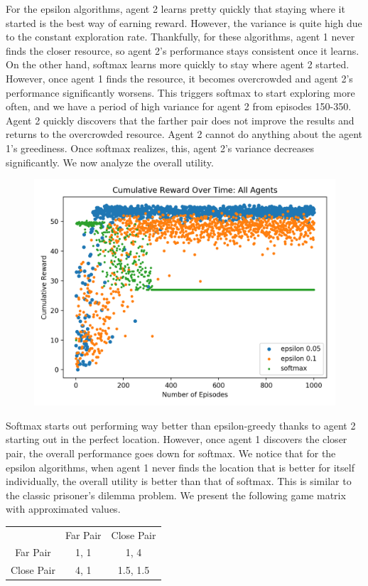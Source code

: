 \documentclass[11pt]{article}
\begin{document}
For the epsilon algorithms, agent 2 learns pretty quickly that staying where it started is the best way of earning reward. However, the variance is quite high due to the constant exploration rate. Thankfully, for these algorithms, agent 1 never finds the closer resource, so agent 2's performance stays consistent once it learns. On the other hand, softmax learns more quickly to stay where agent 2 started. However, once agent 1 finds the resource, it becomes overcrowded and agent 2's performance significantly worsens. This triggers softmax to start exploring more often, and we have a period of high variance for agent 2 from episodes 150-350. Agent 2 quickly discovers that the farther pair does not improve the results and returns to the overcrowded resource. Agent 2 cannot do anything about the agent 1's greediness. Once softmax realizes, this, agent 2's variance decreases significantly. We now analyze the overall utility.


\begin{figure}[H]
  \centering
  \includegraphics[width=.7\textwidth]{ai-env2}
\end{figure}


Softmax starts out performing way better than epsilon-greedy thanks to agent 2 starting out in the perfect location. However, once agent 1 discovers the closer pair, the overall performance goes down for softmax. We notice that for the epsilon algorithms, when agent 1 never finds the location that is better for itself individually, the overall utility is better than that of softmax. This is similar to the classic prisoner's dilemma problem. We present the following game matrix with approximated values.

\begin{center}
\begin{tabular}{ c c c }
  & Far Pair & Close Pair \\ 
 Far Pair & 1, 1 & 1, 4 \\  
 Close Pair & 4, 1 & 1.5, 1.5    
\end{tabular}
\end{center}
\end{document}
